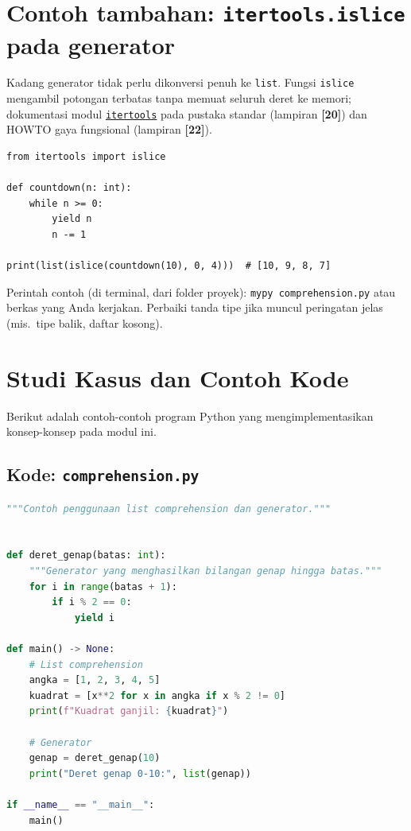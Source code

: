 \documentclass[../main.tex]{subfiles}
\begin{document}
\section{Contoh tambahan: \texttt{itertools.islice} pada generator}

\noindent Kadang generator tidak perlu dikonversi penuh ke \texttt{list}. Fungsi \texttt{islice} mengambil potongan terbatas tanpa memuat seluruh deret ke memori; dokumentasi modul \href{https://docs.python.org/3/library/itertools.html}{\texttt{itertools}} pada pustaka standar (lampiran \textbf{[20]}) dan HOWTO gaya fungsional (lampiran \textbf{[22]}).

\begin{lstlisting}[caption=islice pada generator countdown]
from itertools import islice

def countdown(n: int):
    while n >= 0:
        yield n
        n -= 1

print(list(islice(countdown(10), 0, 4)))  # [10, 9, 8, 7]
\end{lstlisting}

\noindent Perintah contoh (di terminal, dari folder proyek): \texttt{mypy comprehension.py} atau berkas yang Anda kerjakan. Perbaiki tanda tipe jika muncul peringatan jelas (mis.\ tipe balik, daftar kosong).

\section{Studi Kasus dan Contoh Kode}

Berikut adalah contoh-contoh program Python yang mengimplementasikan konsep-konsep pada modul ini.

\subsection{Kode: \texttt{comprehension.py}}
\introstudikasuskode
\begin{lstlisting}[language=Python,caption={\texttt{comprehension.py}}]
"""Contoh penggunaan list comprehension dan generator."""


def deret_genap(batas: int):
    """Generator yang menghasilkan bilangan genap hingga batas."""
    for i in range(batas + 1):
        if i % 2 == 0:
            yield i

def main() -> None:
    # List comprehension
    angka = [1, 2, 3, 4, 5]
    kuadrat = [x**2 for x in angka if x % 2 != 0]
    print(f"Kuadrat ganjil: {kuadrat}")
    
    # Generator
    genap = deret_genap(10)
    print("Deret genap 0-10:", list(genap))

if __name__ == "__main__":
    main()
\end{lstlisting}
\end{document}
